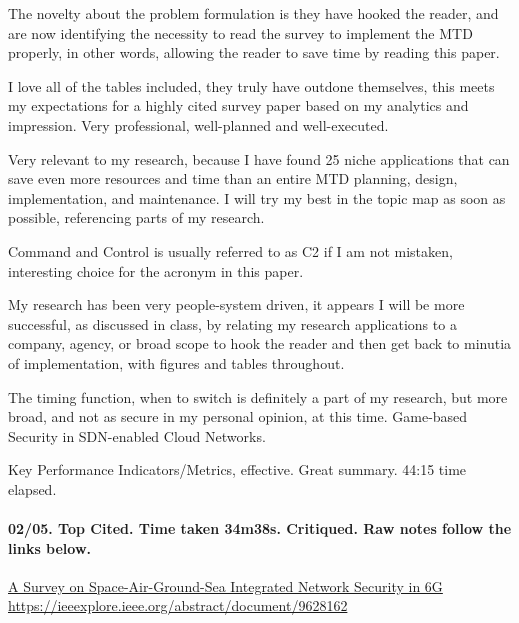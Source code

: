 \documentclass{article}
\begin{document}
{The novelty about the problem formulation is they have hooked the reader, and are now identifying the necessity to read the survey to implement the MTD properly, in other words, allowing the reader to save time by reading this paper.

I love all of the tables included, they truly have outdone themselves, this meets my expectations for a highly cited survey paper based on my analytics and impression. Very professional, well-planned and well-executed.

Very relevant to my research, because I have found 25 niche applications that can save even more resources and time than an entire MTD planning, design, implementation, and maintenance. I will try my best in the topic map as soon as possible, referencing parts of my research.

Command and Control is usually referred to as C2 if I am not mistaken, interesting choice for the acronym in this paper.

My research has been very people-system driven, it appears I will be more successful, as discussed in class, by relating my research applications to a company, agency, or broad scope to hook the reader and then get back to minutia of implementation, with figures and tables throughout.

The timing function, when to switch is definitely a part of my research, but more broad, and not as secure in my personal opinion, at this time. Game-based Security in SDN-enabled Cloud Networks.

Key Performance Indicators/Metrics, effective. Great summary.
44:15 time elapsed.}


        \paragraph{
            \cite{guo_survey_2022}02/05. Top Cited. Time taken 34m38s. Critiqued. Raw notes follow the links below.
        }
        \hfill \break
        \href{
            https://ieeexplore.ieee.org/abstract/document/9628162
        }
            {A Survey on Space-Air-Ground-Sea Integrated Network Security in 6G}
            \\
        \url{https://ieeexplore.ieee.org/abstract/document/9628162}
        \\\\
\end{document}
